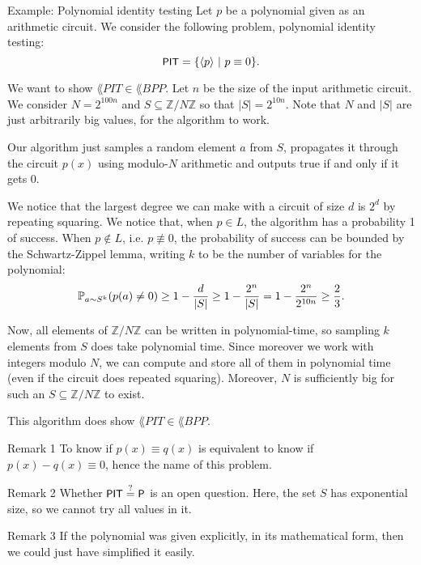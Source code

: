 \documentclass[a4paper]{article}
\begin{document}
\begin{parag}{Example: Polynomial identity testing}
    Let $p$ be a polynomial given as an arithmetic circuit. We consider the following problem, polynomial identity testing: 
    \[\lang{PIT} = \left\{\left\langle p \right\rangle \suchthat p \equiv 0\right\}.\]
    
    We want to show $\lang{PIT} \in \lang{BPP}$. Let $n$ be the size of the input arithmetic circuit. We consider $N = 2^{100 n}$ and $S \subseteq \mathbb{Z}/N\mathbb{Z}$ so that $\left|S\right| = 2^{10 n}$. Note that $N$ and $\left|S\right|$ are just arbitrarily big values, for the algorithm to work.

    Our algorithm just samples a random element $a$ from $S$, propagates it through the circuit $p\left(x\right)$ using modulo-$N$ arithmetic and outputs true if and only if it gets 0.

    We notice that the largest degree we can make with a circuit of size $d$ is $2^d$ by repeating squaring. We notice that, when $p \in L$, the algorithm has a probability 1 of success. When $p \not \in L$, i.e. $p \not\equiv 0$, the probability of success can be bounded by the Schwartz-Zippel lemma, writing $k$ to be the number of variables for the polynomial: 
    \[\prob_{a \followsdistr S^k}\left(p\left(a\right) \neq 0\right) \geq 1 - \frac{d}{\left|S\right|} \geq 1 - \frac{2^n}{\left|S\right|} = 1 - \frac{2^n}{2^{10n}} \geq \frac{2}{3}.\]

    Now, all elements of $\mathbb{Z}/N\mathbb{Z}$ can be written in polynomial-time, so sampling $k$ elements from $S$ does take polynomial time. Since moreover we work with integers modulo $N$, we can compute and store all of them in polynomial time (even if the circuit does repeated squaring). Moreover, $N$ is sufficiently big for such an $S \subseteq \mathbb{Z}/N\mathbb{Z}$ to exist.

    This algorithm does show $\lang{PIT} \in \lang{BPP}$.


    \begin{subparag}{Remark 1}
        To know if $p\left(x\right) \equiv q\left(x\right)$ is equivalent to know if $p\left(x\right)- q\left(x\right) \equiv 0$, hence the name of this problem.
    \end{subparag}

    \begin{subparag}{Remark 2}
        Whether $\lang{PIT} \over{=}{?} \lang{P}$ is an open question. Here, the set $S$ has exponential size, so we cannot try all values in it.
    \end{subparag}

    \begin{subparag}{Remark 3}
        If the polynomial was given explicitly, in its mathematical form, then we could just have simplified it easily.
    \end{subparag}
\end{parag}
\end{document}
